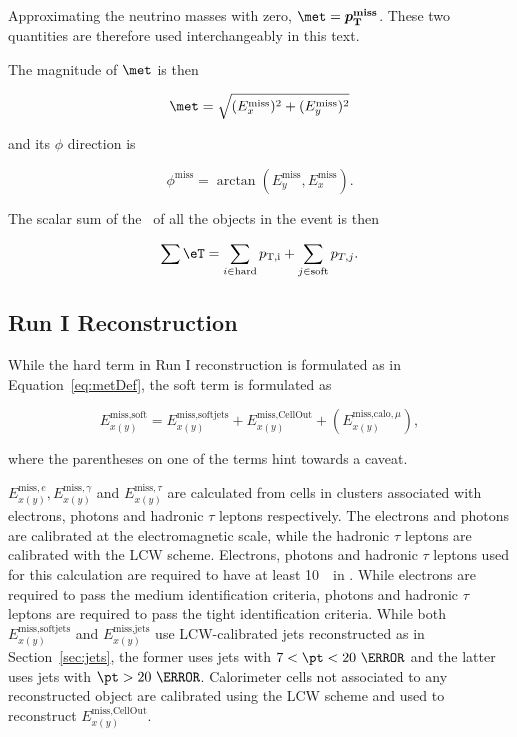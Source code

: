 \par Approximating the neutrino masses with zero, $\boldsymbol{\met}=\boldsymbol{p_{\mathrm T}^{\mathrm{miss}}}$. These 
two quantities are therefore used interchangeably in this text.  

\par The magnitude of $\boldsymbol{\met}$ is then   

\begin{equation}
\met = \sqrt{(E^{\text{miss}}_x)^2 + (E^{\text{miss}}_y)^2}
\end{equation}
 
and its $\phi$ direction is 

\begin{equation}
\phi^{\text{miss}} = \arctan(E^{\text{miss}}_y,E^{\text{miss}}_x).
\end{equation}   

The scalar sum of the \pt\ of all the objects in the event is then 

\begin{equation}
\sum\eT = \sum_{i\in\text{hard}}p_{\text{T,i}} + \sum_{j\in\text{soft}}p_{T,j}.
\end{equation}

\subsection{Run I Reconstruction}
\label{sec:runImet}
\par While the hard term in Run I reconstruction is formulated as in Equation~\ref{eq:metDef}, the soft term is formulated as 
 
\begin{dmath}
E^{\text{miss,soft}}_{x(y)} = E^{\text{miss,softjets}}_{x(y)} +E^{\text{miss,CellOut}}_{x(y)} + (E^{\text{miss,calo},\mu}_{x(y)}),
\label{eq:softmetDef}
\end{dmath} 

where the parentheses on one of the terms hint towards a caveat. 

\par $E^{\text{miss},e}_{x(y)}, E^{\text{miss},\gamma}_{x(y)}$ and $E^{\text{miss},\tau}_{x(y)}$ are calculated from cells in clusters 
associated with electrons, photons and hadronic $\tau$ leptons respectively. The electrons and photons are calibrated at the 
electromagnetic scale, while the hadronic $\tau$ leptons are calibrated with the LCW scheme. 
Electrons, photons and hadronic $\tau$ leptons used for this calculation are required to have at least 10~\GeV\ in \pt.
While electrons are required to pass the medium identification criteria, photons and hadronic $\tau$ leptons are 
required to pass the tight identification criteria. While both $E^{\text{miss,softjets}}_{x(y)}$ and  
$E^{\text{miss,jets}}_{x(y)}$ use LCW-calibrated jets reconstructed as in Section~\ref{sec:jets}, the former uses 
jets with $7<\pt<20~\GeV$ and the latter uses jets with $\pt>20~\GeV$. Calorimeter cells 
not associated to any reconstructed object are calibrated using the LCW scheme and used to reconstruct 
 $E^{\text{miss,CellOut}}_{x(y)}$. 

